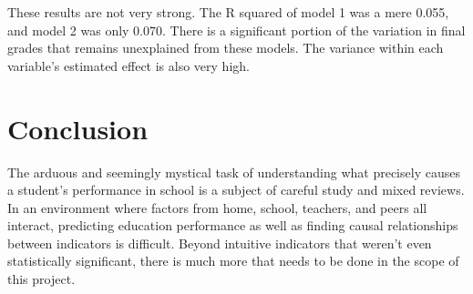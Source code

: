 \documentclass[12pt,english]{article}
\begin{document}
These results are not very strong. The R squared of model 1 was a mere 0.055, and model 2 was only 0.070. There is a significant portion of the variation in final grades that remains unexplained from these models. The variance within each variable's estimated effect is also very high. 
\pagebreak{}

\section{Conclusion}\label{sec:conclusion}
The arduous and seemingly mystical task of understanding what precisely causes a student's performance in school is a subject of careful study and mixed reviews. In an environment where factors from home, school, teachers, and peers all interact, predicting education performance as well as finding causal relationships between indicators is difficult. Beyond intuitive indicators that weren't even statistically significant, there is much more that needs to be done in the scope of this project. 

\vfill
\pagebreak{}
\begin{spacing}{1.0}

\nocite{*}

\end{spacing}

\vfill
\pagebreak{}
\clearpage

\end{document}
